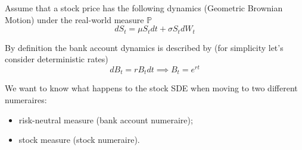 \documentclass[12pt,a4paper]{book}
\begin{document}
\begin{exercise}[subtitle=Moving Away from $\mathbb{P}$ Measure]
Assume that a stock price has the following dynamics (Geometric Brownian Motion) under the real-world measure $\mathbb{P}$
\begin{equation*}
dS_t = \mu S_t dt + \sigma S_t dW_t
\end{equation*}

By definition the bank account dynamics is described by (for simplicity let's consider deterministic rates)
\begin{equation*}
dB_t = rB_tdt\implies B_t = e^{rt}
\end{equation*}

We want to know what happens to the stock SDE when moving to two different numeraires:
\begin{itemize}
\item risk-neutral measure (bank account numeraire);
\item stock measure (stock numeraire).
\end{itemize}
\end{exercise}
\end{document}
